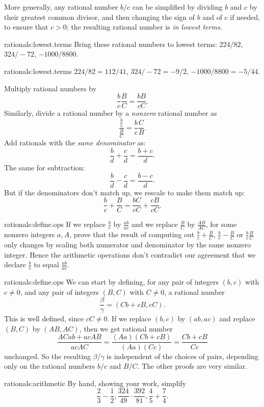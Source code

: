 More generally, any rational number \(b/c\) can be simplified by dividing \(b\) and \(c\) by their greatest common divisor, and then changing the sign of \(b\) and of \(c\) if needed, to ensure that \(c > 0\); the resulting rational number is \emph{in lowest terms}.
\begin{problem}{rationals:lowest.terms}
Bring these rational numbers to lowest terms: \(224/82\), \(324/-72\), \(-\num{1000}/\num{8800}\).
\end{problem}
\begin{answer}{rationals:lowest.terms}
\(224/82=112/41\), \(324/-72=-9/2\), \(-\num{1000}/\num{8800}=-5/44\).
\end{answer}
Multiply rational numbers by
\[
\frac{b}{c} \frac{B}{C} = \frac{bB}{cC}.
\]
Similarly, divide a rational number by a \emph{nonzero} rational number as
\[
\frac{\frac{b}{c}}{\frac{B}{C}} = \frac{b}{c} \frac{C}{B}.
\]
Add rationals with the \emph{same denominator} as:
\[
\frac{b}{d} + \frac{c}{d} = \frac{b+c}{d}.
\]
The same for subtraction:
\[
\frac{b}{d} - \frac{c}{d} = \frac{b-c}{d}.
\]
But if the denominators don't match up, we rescale to make them match up:
\[
\frac{b}{c} + \frac{B}{C} = \frac{bC}{cC} + \frac{cB}{cC}.
\]
\begin{problem}{rationals:define.ops}
If we replace \(\frac{b}{c}\) by \(\frac{ab}{ac}\) and we replace \(\frac{B}{C}\) by \(\frac{AB}{AC}\), for some nonzero integers \(a,A\), prove that the result of computing out \(\frac{b}{c}+\frac{B}{C}\), \(\frac{b}{c}-\frac{B}{C}\) or \(\frac{b}{c}\frac{B}{C}\) only changes by scaling both numerator and denominator by the same nonzero integer.
Hence the arithmetic operations don't contradict our agreement that we declare \(\frac{b}{c}\) to equal \(\frac{ab}{ac}\).
\end{problem}
\begin{answer}{rationals:define.ops}
We can start by defining, for any pair of integers \((b,c)\) with \(c \ne 0\), and any pair of integers \((B,C)\) with \(C \ne 0\), a rational number  
\[
\frac{\beta}{\gamma}=(Cb+cB,cC).
\]
This is well defined, since \(cC \ne 0\).
If we replace \((b,c)\) by \((ab,ac)\) and replace \((B,C)\) by \((AB,AC)\), then we get rational number
\[
\frac{ACab+acAB}{acAC}=\frac{(Aa)(Cb+cB)}{(Aa)(Cc)}=\frac{Cb+cB}{Cc}
\]
unchanged.
So the resulting \(\beta/\gamma\) is independent of the choices of pairs, depending only on the rational numbers \(b/c\) and \(B/C\).
The other proofs are very similar.
\end{answer}
\begin{problem}{rationals:arithmetic}
By hand, showing your work, simplify
\[
\frac{2}{3}-\frac{1}{2}, \frac{324}{49} \cdot \frac{392}{81},
\frac{4}{5}+\frac{7}{4}.
\]
\end{problem}
